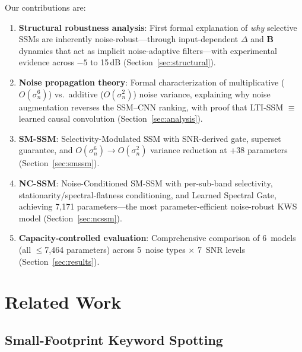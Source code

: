 \documentclass[journal]{IEEEtran}
\begin{document}
Our contributions are:
\begin{enumerate}
\setlength\itemsep{0pt}
\item \textbf{Structural robustness analysis}: First formal explanation of \emph{why} selective SSMs are inherently noise-robust---through input-dependent $\Delta$ and $\mathbf{B}$ dynamics that act as implicit noise-adaptive filters---with experimental evidence across $-5$ to 15\,dB (Section~\ref{sec:structural}).

\item \textbf{Noise propagation theory}: Formal characterization of multiplicative ($O(\sigma_n^6)$) vs.\ additive ($O(\sigma_n^2)$) noise variance, explaining why noise augmentation reverses the SSM--CNN ranking, with proof that LTI-SSM $\equiv$ learned causal convolution (Section~\ref{sec:analysis}).

\item \textbf{SM-SSM}: Selectivity-Modulated SSM with SNR-derived gate, superset guarantee, and $O(\sigma_n^6) \to O(\sigma_n^2)$ variance reduction at +38 parameters (Section~\ref{sec:smssm}).

\item \textbf{NC-SSM}: Noise-Conditioned SM-SSM with per-sub-band selectivity, stationarity/spectral-flatness conditioning, and Learned Spectral Gate, achieving 7{,}171 parameters---the most parameter-efficient noise-robust KWS model (Section~\ref{sec:ncssm}).

\item \textbf{Capacity-controlled evaluation}: Comprehensive comparison of 6~models (all $\leq$7{,}464 parameters) across 5~noise types $\times$ 7~SNR levels (Section~\ref{sec:results}).
\end{enumerate}


\section{Related Work}
\label{sec:related}

\subsection{Small-Footprint Keyword Spotting}
\end{document}
